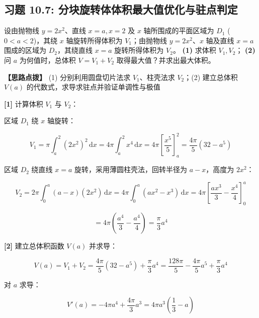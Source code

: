 \documentclass[11pt,a4paper,UTF8]{ctexart}
\begin{document}
\subsection{习题 10.7: 分块旋转体体积最大值优化与驻点判定}

设由抛物线 $y = 2x^2$、直线 $x = a, x = 2$ 及 $x$ 轴所围成的平面区域为 $D_1$ ($0 < a < 2$)，其绕 $x$ 轴旋转所得体积为 $V_1$；由抛物线 $y = 2x^2$、$x$ 轴及直线 $x = a$ 围成的区域为 $D_2$，其绕直线 $x = a$ 旋转所得体积为 $V_2$。
\textbf{(1)}  求体积 $V_1, V_2$；
\textbf{(2)}  问 $a$ 为何值时，总体积 $V = V_1 + V_2$ 取得最大值？并求出最大体积。

\textbf{\color{DeepPurple}【思路点拨】} (1) 分别利用圆盘切片法求 $V_1$、柱壳法求 $V_2$；(2) 建立总体积 $V(a)$ 的代数式，求导求驻点并验证单调性与极值


\begin{solbox}[分步推导与答题规范]
\textbf{[1]} 计算体积 $V_1$ 与 $V_2$：

区域 $D_1$ 绕 $x$ 轴旋转：


\begin{equation*}
V_1 = \pi \int_a^2 (2x^2)^2\,\mathrm{d}x = 4\pi \int_a^2 x^4\,\mathrm{d}x = 4\pi \left[\frac{x^5}{5}\right]_a^2 = \frac{4\pi}{5}(32 - a^5)
\end{equation*}


区域 $D_2$ 绕直线 $x = a$ 旋转，采用薄圆柱壳法，回转半径为 $a - x$，高度为 $2x^2$：


\begin{equation*}
V_2 = 2\pi \int_0^a (a - x)(2x^2)\,\mathrm{d}x = 4\pi \int_0^a (ax^2 - x^3)\,\mathrm{d}x = 4\pi \left[\frac{a x^3}{3} - \frac{x^4}{4}\right]_0^a
\end{equation*}



\begin{equation*}
= 4\pi \left(\frac{a^4}{3} - \frac{a^4}{4}\right) = \frac{\pi}{3}a^4
\end{equation*}


\textbf{[2]} 建立总体积函数 $V(a)$ 并求导：


\begin{equation*}
V(a) = V_1 + V_2 = \frac{4\pi}{5}(32 - a^5) + \frac{\pi}{3}a^4 = \frac{128\pi}{5} - \frac{4\pi}{5}a^5 + \frac{\pi}{3}a^4
\end{equation*}


对 $a$ 求导：


\begin{equation*}
V'(a) = -4\pi a^4 + \frac{4\pi}{3}a^3 = 4\pi a^3 \left(\frac{1}{3} - a\right)
\end{equation*}



\end{solbox}
\end{document}
